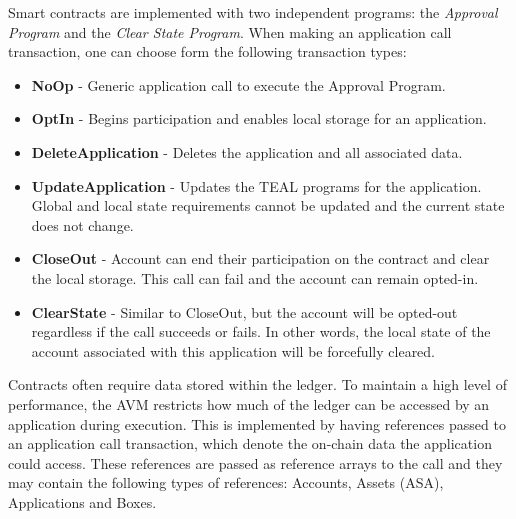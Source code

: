 Smart contracts are implemented with two independent programs: the \textit{Approval Program} and the \textit{Clear State Program}. When making an application call transaction, one can choose form the following transaction types:
\begin{itemize}
    \item \textbf{NoOp} - Generic application call to execute the Approval Program.
    \item \textbf{OptIn} - Begins participation and enables local storage for an application.
    \item \textbf{DeleteApplication} - Deletes the application and all associated data.
    \item \textbf{UpdateApplication} - Updates the TEAL programs for the application. Global and local state requirements cannot be updated and the current state does not change.
    \item \textbf{CloseOut} - Account can end their participation on the contract and clear the local storage. This call can fail and the account can remain opted-in.
    \item \textbf{ClearState} - Similar to CloseOut, but the account will be opted-out regardless if the call succeeds or fails. In other words, the local state of the account associated with this application will be forcefully cleared.
\end{itemize}

Contracts often require data stored within the ledger. To maintain a high level of performance, the \ac{AVM} restricts how much of the ledger can be accessed by an application during execution. This is implemented by having references passed to an application call transaction, which denote the on-chain data the application could access. These references are passed as reference arrays to the call and they may contain the following types of references: Accounts, Assets (\ac{ASA}), Applications and Boxes.

